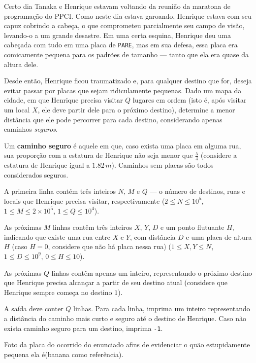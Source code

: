 Certo dia Tanaka e Henrique estavam voltando da reunião da maratona de programação do PPCI. Como neste dia estava garoando, Henrique estava com seu capuz cobrindo a cabeça, o que comprometeu parcialmente seu campo de visão, levando-o a um grande desastre.  
Em uma certa esquina, Henrique deu uma cabeçada com tudo em uma placa de \texttt{PARE}, mas em sua defesa, essa placa era comicamente pequena para os padrões de tamanho — tanto que ela era quase da altura dele.  

Desde então, Henrique ficou traumatizado e, para qualquer destino que for, deseja evitar passar por placas que sejam ridiculamente pequenas.  
Dado um mapa da cidade, em que Henrique precisa visitar $Q$ lugares em ordem (isto é, após visitar um local $X$, ele deve partir dele para o próximo destino), determine a menor distância que ele pode percorrer para cada destino, considerando apenas caminhos \textit{seguros}.  

Um \textbf{caminho seguro} é aquele em que, caso exista uma placa em alguma rua, sua proporção com a estatura de Henrique não seja menor que $\frac{5}{4}$ (considere a estatura de Henrique igual a $1.82\,m$). Caminhos sem placas são todos considerados seguros.

A primeira linha contém três inteiros $N$, $M$ e $Q$ — o número de destinos, ruas e locais que Henrique precisa visitar, respectivamente  
($2 \leq N \leq 10^5$, $1 \leq M \leq 2 \times 10^5$, $1 \leq Q \leq 10^4$).  

As próximas $M$ linhas contêm três inteiros $X$, $Y$, $D$ e um ponto flutuante $H$, indicando que existe uma rua entre $X$ e $Y$, com distância $D$ e uma placa de altura $H$ (caso $H = 0$, considere que não há placa nessa rua)  
($1 \leq X, Y \leq N$, $1 \leq D \leq 10^9$, $0 \leq H \leq 10$).  

As próximas $Q$ linhas contêm apenas um inteiro, representando o próximo destino que Henrique precisa alcançar a partir de seu destino atual (considere que Henrique sempre começa no destino $1$).


A saída deve conter $Q$ linhas.  
Para cada linha, imprima um inteiro representando a distância do caminho mais curto e seguro até o destino de Henrique.  
Caso não exista caminho seguro para um destino, imprima \texttt{-1}.

Foto da placa do ocorrido do enunciado afins de evidenciar o quão estupidamente pequena ela é(banana como referência).

